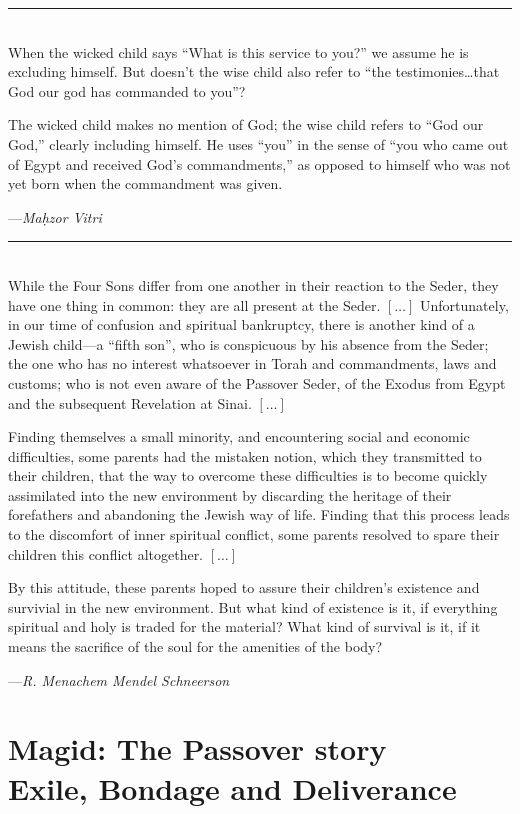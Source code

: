 \documentclass[a4paper,10pt,openany]{memoir}
\newcommand{\HgEllipsis}{\ensuremath{\left[\ldots\right]}}
\newcommand{\HgSource}[1]{\hfill{\small---\itshape{#1}}}
\newcommand{\HgFill}{\vfill \hrule \vfill}
\newenvironment{HgEnglish}{\strut\\\noindent}{\vspace{1em}}
\newcommand{\LSrc}{\textsuperscript{\upshape{[L]}}}
\begin{document}
\HgFill

\begin{HgEnglish}
  When the wicked child says “What is this service to you?” we assume he is
  excluding himself. But doesn’t the wise child also refer to “the
  testimonies\ldots{}that God our god has commanded to you”?

  The wicked child makes no mention of God; the wise child refers to “God our
  God,” clearly including himself. He uses “you” in the sense of “you who came
  out of Egypt and received God’s commandments,” as opposed to himself who was
  not yet born when the commandment was given.

  \HgSource{Ma\d{h}zor Vitri \LSrc}
\end{HgEnglish}

\HgFill

\begin{HgEnglish}
  While the Four Sons differ from one another in their reaction to the Seder,
  they have one thing in common: they are all present at the Seder.
  \HgEllipsis{} Unfortunately, in our time of confusion and spiritual
  bankruptcy, there is another kind of a Jewish child---a ``fifth son'', who is
  conspicuous by his absence from the Seder; the one who has no interest
  whatsoever in Torah and commandments, laws and customs; who is not even aware
  of the Passover Seder, of the Exodus from Egypt and the subsequent Revelation
  at Sinai. \HgEllipsis

  Finding themselves a small minority, and encountering social and economic
  difficulties, some parents had the mistaken notion, which they transmitted to
  their children, that the way to overcome these difficulties is to become
  quickly assimilated into the new environment by discarding the heritage of
  their forefathers and abandoning the Jewish way of life. Finding that this
  process leads to the discomfort of inner spiritual conflict, some parents
  resolved to spare their children this conflict altogether. \HgEllipsis

  By this attitude, these parents hoped to assure their children's existence and
  survivial in the new environment. But what kind of existence is it, if
  everything spiritual and holy is traded for the material? What kind of
  survival is it, if it means the sacrifice of the soul for the amenities of the
  body?

  \HgSource{R. Menachem Mendel Schneerson}
\end{HgEnglish}


\chapter*{Magid: The Passover story \\ {\LARGE Exile, Bondage and Deliverance}}
\end{document}
